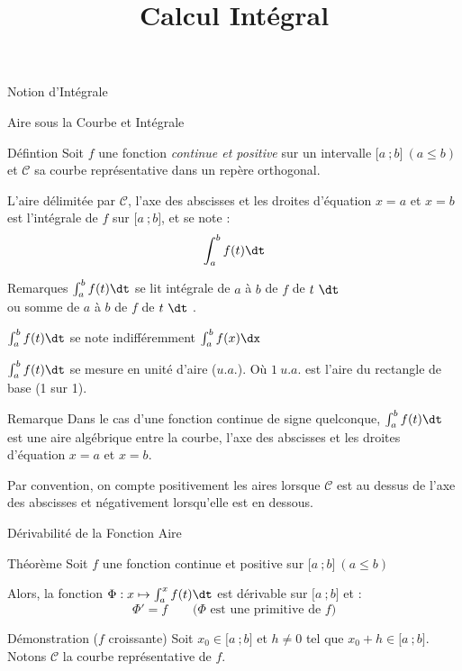 \documentclass{cours}
\title{Calcul Intégral}
\begin{document}
    
    \begin{Gpartie}{Notion d'Intégrale} 
        \begin{Spartie}{Aire sous la Courbe et Intégrale} 
            \begin{SSpartie}{Défintion} 
                Soit $f$ une fonction \emph{continue et positive} sur un intervalle $\big[a~;b\big]~\left(a\leq b\right)$ et $\mathcal{C}$ sa courbe représentative dans un repère orthogonal.

                L'aire délimitée par $\mathcal{C}$, l'axe des abscisses et les droites d'équation $x=a$ et $x=b$ est l'intégrale de $f$ sur $\big[a~;b\big]$, et se note : \[\int_a^b f(t)\dt\]
            \end{SSpartie}
            \begin{SSpartie}{Remarques} 
                $\int_a^b f(t)\dt$ se lit \og intégrale de $a$ à $b$ de $f$ de $t~\dt$ \fg{} \\ ou \og somme de $a$ à $b$ de $f$ de $t~\dt$ \fg{}.

                $\int_a^b f(t)\dt$ se note indifféremment $\int_a^b f(x)\dx$

                $\int_a^b f(t)\dt$ se mesure en unité d'aire ($u.a.$). Où $1~u.a.$ est l'aire du rectangle de base (1 sur 1).
            \end{SSpartie}
            \begin{SSpartie}{Remarque} 
                Dans le cas d'une fonction continue de signe quelconque, $\int_a^b f(t)\dt$ est une aire algébrique entre la courbe, l'axe des abscisses et les droites d'équation $x=a$ et $x=b$.

                Par convention, on compte positivement les aires lorsque $\mathcal{C}$ est au dessus de l'axe des abscisses et négativement lorsqu'elle est en dessous.
            \end{SSpartie}
        \end{Spartie}
        \pagebreak
        \begin{Spartie}{Dérivabilité de la Fonction Aire} 
            \begin{SSpartie}{Théorème} 
                Soit $f$ une fonction continue et positive sur $\big[a~;b\big]~\left(a\leq b\right)$

                Alors, la fonction $\Phi:x\mapsto\int_a^xf(t)\dt$ est dérivable sur $\big[a~;b\big]$ et : \[\Phi'=f\qquad\text{($\Phi$ est une primitive de $f$)}\]
                \begin{SSSpartie}{Démonstration \big($f$ croissante\big)} 
                    Soit $x_0\in\big[a~;b\big]$ et $h\neq 0$ tel que $x_0+h\in\big[a~;b\big]$. Notons $\mathcal{C}$ la courbe représentative de $f$.


\end{SSSpartie}
\end{SSpartie}
\end{Spartie}
\end{Gpartie}
\end{document}
